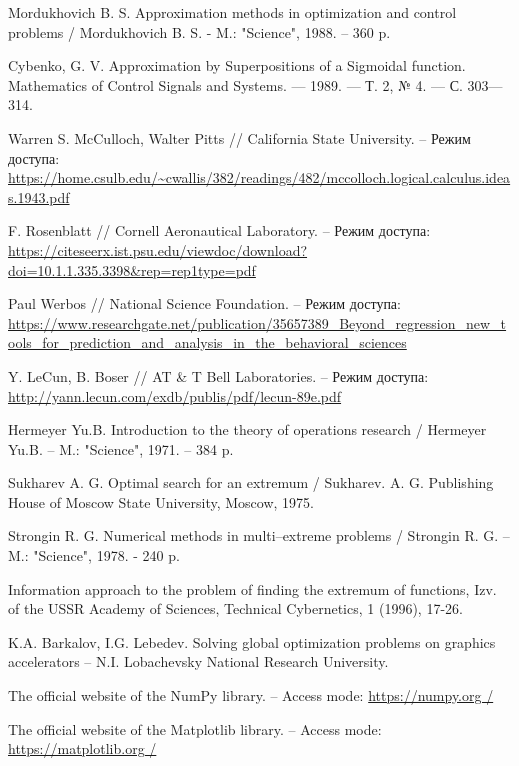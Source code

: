 \documentclass[11pt, oneside, a4paper]{article}
\begin{document}
\begin{biblioen}

Mordukhovich B. S. Approximation methods in optimization and control problems / Mordukhovich B. S. - M.: "Science", 1988. – 360 p.

Cybenko, G. V. Approximation by Superpositions of a Sigmoidal function. Mathematics of Control Signals and Systems. — 1989. — Т. 2, № 4. — С. 303—314.

Warren S. McCulloch, Walter Pitts // California State University. – Режим доступа: \url{https://home.csulb.edu/~cwallis/382/readings/482/mccolloch.logical.calculus.ideas.1943.pdf}

F. Rosenblatt // Cornell Aeronautical Laboratory. – Режим доступа: \url{https://citeseerx.ist.psu.edu/viewdoc/download?doi=10.1.1.335.3398&rep=rep1type=pdf}

Paul Werbos // National Science Foundation. – Режим доступа: \url{https://www.researchgate.net/publication/35657389_Beyond_regression_new_tools_for_prediction_and_analysis_in_the_behavioral_sciences}

Y. LeCun, B. Boser // AT \& T  Bell Laboratories. – Режим доступа: \url{http://yann.lecun.com/exdb/publis/pdf/lecun-89e.pdf}

Hermeyer Yu.B. Introduction to the theory of operations research / Hermeyer Yu.B. – M.: "Science", 1971. – 384 p.

Sukharev A. G. Optimal search for an extremum / Sukharev. A. G. Publishing House of Moscow State University, Moscow, 1975.

Strongin R. G. Numerical methods in multi–extreme problems / Strongin R. G. – M.: "Science", 1978. - 240 p.

Information approach to the problem of finding the extremum of functions, Izv. of the USSR Academy of Sciences, Technical Cybernetics, 1 (1996), 17-26.

K.A. Barkalov, I.G. Lebedev. Solving global optimization
problems on graphics accelerators – N.I. Lobachevsky National Research University.

The official website of the NumPy library. – Access mode: \url{https://numpy.org /}

The official website of the Matplotlib library. – Access mode: \url{https://matplotlib.org /}


\end{biblioen}
\end{document}
